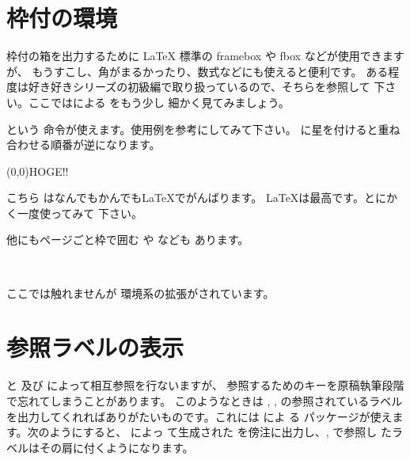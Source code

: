 \section{枠付の環境\texorpdfstring{\zdash}{---}}

枠付の箱を出力するために LaTeX 標準の framebox や fbox などが使用できますが、
もうすこし、角がまるかったり、数式などにも使えると便利です。
ある程度は好き好きシリーズの初級編で取り扱っているので、そちらを参照して
下さい。ここではによる  をもう少し
細かく見てみましょう。
\begin{Syntax}
\end{Syntax}
という  命令が使えます。使用例を参考にしてみて下さい。
 に星を付けると重ね合わせる順番が逆になります。
\begin{InOut}
\usepackage{fancybox,color}
\boxput(0,0){\color{blue}\Huge HOGE!!}{%
  \color{red}\parbox{.5\linewidth}{こちら
はなんでもかんでも\LaTeX でがんばります。
\LaTeX は最高です。とにかく一度使ってみて
下さい。}} 
\end{InOut}
他にもページごと枠で囲む  や  なども
あります。
\begin{Syntax}
 \\
\end{Syntax}
ここでは触れませんが  環境系の拡張がされています。

\section{参照ラベルの表示\texorpdfstring{\zdash}{---}}
 と  及び  によって相互参照を行ないますが、
参照するためのキーを原稿執筆段階で忘れてしまうことがあります。
このようなときは , ,  の参照されているラベル
を出力してくれればありがたいものです。これには によ
る  パッケージが使えます。次のようにすると、 によっ
て生成された  を傍注に出力し、,  で参照し
たラベルはその肩に付くようになります。

